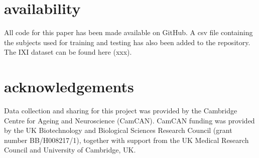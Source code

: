 \documentclass{article}
\begin{document}
\section{availability}

All code for this paper has been made available on GitHub. A csv file containing the subjects used for training and testing has also been added to the repository. The IXI dataset can be found here (xxx). 


\section{acknowledgements}

Data collection and sharing for this project was provided by the Cambridge Centre for Ageing and Neuroscience (CamCAN). CamCAN funding was provided by the UK Biotechnology and Biological Sciences Research Council (grant number BB/H008217/1), together with support from the UK Medical Research Council and University of Cambridge, UK.
\end{document}

